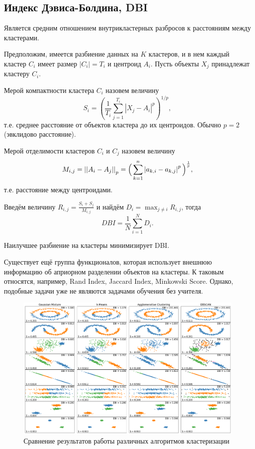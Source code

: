 \documentclass[10pt]{article}
\begin{document}
\subsection{Индекс Дэвиса-Болдина, DBI}

Является средним отношением внутрикластерных разбросов к расстояниям между кластерами. 

Предположим, имеется разбиение данных на $K$ кластеров, и в нем каждый кластер $C_i$ имеет размер $|C_i| = T_i$ и центроид $A_i$. Пусть объекты $X_j$ принадлежат кластеру $C_i$. 

Мерой компактности кластера $C_i$ назовем величину $$S_ {i} = \left({\dfrac{1}{T_{i}}}\sum_{j=1}^{T_{i}}{\left|X_{j}-A_{i}\right|^{p}}\right)^{1/p},$$ т.е. среднее расстояние от объектов кластера до их центроидов. Обычно $p = 2$ (эвклидово расстояние).

Мерой отделимости кластеров $C_i$ и $C_j$ назовем величину
$$M _ {{i, j}} = \left | \left | A_ {i} -A_ {j} \right | \right |_ {p} = { \Bigl (} \sum_{{k = 1 }} ^ {{n}} \left | a_{{k, i}} - a_{{k, j}} \right | ^ {p} { \Bigr)} ^ {{{ \frac 1p}}},$$ т.е. расстояние между центроидами.

Введём величину $R_{{i, j}} = \frac{S_{i} + S_{j}}{M_{{i, j}}}$ и найдём $D_{i} = \max_{j \neq i} R_{i, j}$, тогда $$DBI = \frac{1}{N} \sum_{i=1}^{N}D_{i}.$$

Наилучшее разбиение на кластеры минимизирует DBI.

Существует ещё группа функционалов, которая использует внешнюю информацию об априорном разделении объектов на кластеры. 
К таковым относятся, например, Rand Index, Jaccard Index, Minkowski Score.
Однако, подобные задачи уже не являются задачами обучения без учителя.

\begin{figure}[H]
	\begin{center}
		\includegraphics[scale = 0.3]{qual.png}
		\caption{Сравнение результатов работы различных алгоритмов кластеризации}
	\end{center}
\end{figure}
\end{document}

